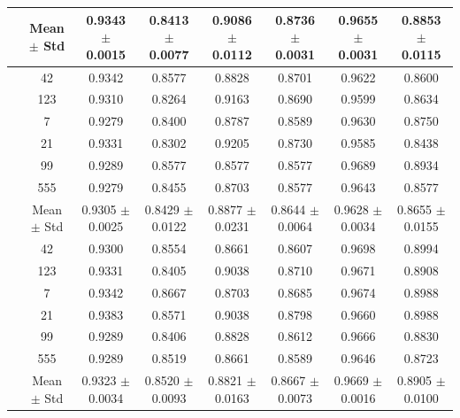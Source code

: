 \documentclass{article}
\begin{document}
\begin{table}[htbp]
{\begin{tabular}{>{\raggedright\arraybackslash}p{3.2cm}ccccccc}
			\cmidrule(lr){2-8}
			
			& Mean $\pm$ Std
			& 0.9343 $\pm$ 0.0015
			& 0.8413 $\pm$ 0.0077
			& 0.9086 $\pm$ 0.0112
			& 0.8736 $\pm$ 0.0031
			& 0.9655 $\pm$ 0.0031
			& 0.8853 $\pm$ 0.0115 \\
			
			\midrule
			
			
			\multirow{8}{*}{Without Contrastive Loss}
			& 42  & 0.9342 & 0.8577 & 0.8828 & 0.8701 & 0.9622 & 0.8600 \\
			& 123 & 0.9310 & 0.8264 & 0.9163 & 0.8690 & 0.9599 & 0.8634 \\
			& 7   & 0.9279 & 0.8400 & 0.8787 & 0.8589 & 0.9630 & 0.8750 \\
			& 21  & 0.9331 & 0.8302 & 0.9205 & 0.8730 & 0.9585 & 0.8438 \\
			& 99  & 0.9289 & 0.8577 & 0.8577 & 0.8577 & 0.9689 & 0.8934 \\
			& 555 & 0.9279 & 0.8455 & 0.8703 & 0.8577 & 0.9643 & 0.8577 \\
			
			\cmidrule(lr){2-8}
			
			& Mean $\pm$ Std
			& 0.9305 $\pm$ 0.0025
			& 0.8429 $\pm$ 0.0122
			& 0.8877 $\pm$ 0.0231
			& 0.8644 $\pm$ 0.0064
			& 0.9628 $\pm$ 0.0034
			& 0.8655 $\pm$ 0.0155 \\
			
			\midrule
			
			\multirow{8}{*}{Without Cross Attention}
			& 42  & 0.9300 & 0.8554 & 0.8661 & 0.8607 & 0.9698 & 0.8994 \\
			& 123 & 0.9331 & 0.8405 & 0.9038 & 0.8710 & 0.9671 & 0.8908 \\
			& 7   & 0.9342 & 0.8667 & 0.8703 & 0.8685 & 0.9674 & 0.8988 \\
			& 21  & 0.9383 & 0.8571 & 0.9038 & 0.8798 & 0.9660 & 0.8988 \\
			& 99  & 0.9289 & 0.8406 & 0.8828 & 0.8612 & 0.9666 & 0.8830 \\
			& 555 & 0.9289 & 0.8519 & 0.8661 & 0.8589 & 0.9646 & 0.8723 \\
			
			\cmidrule(lr){2-8}
			
			& Mean $\pm$ Std
			& 0.9323 $\pm$ 0.0034
			& 0.8520 $\pm$ 0.0093
			& 0.8821 $\pm$ 0.0163
			& 0.8667 $\pm$ 0.0073
			& 0.9669 $\pm$ 0.0016
			& 0.8905 $\pm$ 0.0100 \\
			
		\end{tabular}%
	}
	
\end{table}
\end{document}
